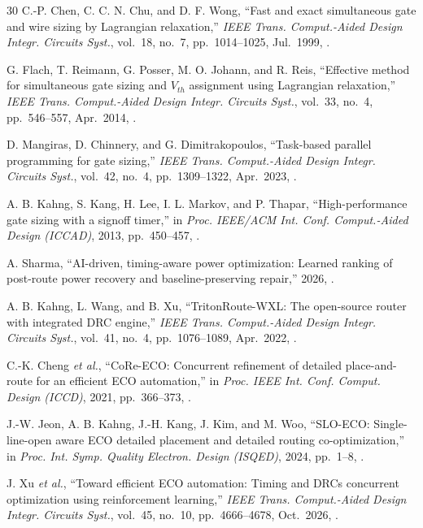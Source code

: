 \documentclass[twocolumn,10pt,fontset=windows]{ctexart}
\begin{document}
\begin{thebibliography}{30}
C.-P. Chen, C. C. N. Chu, and D. F. Wong, ``Fast and exact simultaneous gate and wire sizing by Lagrangian relaxation,'' \emph{IEEE Trans. Comput.-Aided Design Integr. Circuits Syst.}, vol.~18, no.~7, pp.~1014--1025, Jul.~1999, .

G. Flach, T. Reimann, G. Posser, M. O. Johann, and R. Reis, ``Effective method for simultaneous gate sizing and $V_{th}$ assignment using Lagrangian relaxation,'' \emph{IEEE Trans. Comput.-Aided Design Integr. Circuits Syst.}, vol.~33, no.~4, pp.~546--557, Apr.~2014, .

D. Mangiras, D. Chinnery, and G. Dimitrakopoulos, ``Task-based parallel programming for gate sizing,'' \emph{IEEE Trans. Comput.-Aided Design Integr. Circuits Syst.}, vol.~42, no.~4, pp.~1309--1322, Apr.~2023, .

A. B. Kahng, S. Kang, H. Lee, I. L. Markov, and P. Thapar, ``High-performance gate sizing with a signoff timer,'' in \emph{Proc. IEEE/ACM Int. Conf. Comput.-Aided Design (ICCAD)}, 2013, pp.~450--457, .

A. Sharma, ``AI-driven, timing-aware power optimization: Learned ranking of post-route power recovery and baseline-preserving repair,'' 2026, .

A. B. Kahng, L. Wang, and B. Xu, ``TritonRoute-WXL: The open-source router with integrated DRC engine,'' \emph{IEEE Trans. Comput.-Aided Design Integr. Circuits Syst.}, vol.~41, no.~4, pp.~1076--1089, Apr.~2022, .

C.-K. Cheng \emph{et al.}, ``CoRe-ECO: Concurrent refinement of detailed place-and-route for an efficient ECO automation,'' in \emph{Proc. IEEE Int. Conf. Comput. Design (ICCD)}, 2021, pp.~366--373, .

J.-W. Jeon, A. B. Kahng, J.-H. Kang, J. Kim, and M. Woo, ``SLO-ECO: Single-line-open aware ECO detailed placement and detailed routing co-optimization,'' in \emph{Proc. Int. Symp. Quality Electron. Design (ISQED)}, 2024, pp.~1--8, .

J. Xu \emph{et al.}, ``Toward efficient ECO automation: Timing and DRCs concurrent optimization using reinforcement learning,'' \emph{IEEE Trans. Comput.-Aided Design Integr. Circuits Syst.}, vol.~45, no.~10, pp.~4666--4678, Oct.~2026, .


\end{thebibliography}
\end{document}
